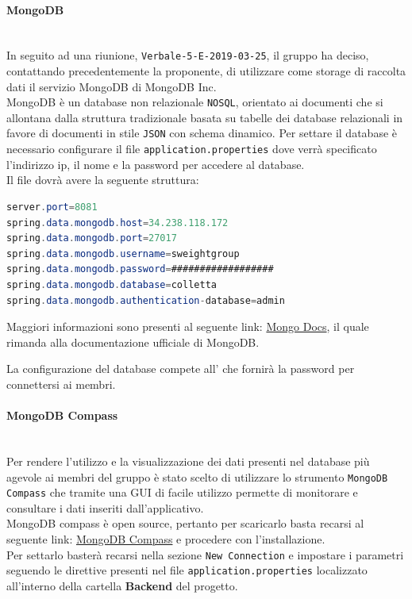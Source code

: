 \paragraph{MongoDB}\mbox{}\\
In seguito ad una riunione, \texttt{Verbale-5-E-2019-03-25}, il gruppo ha deciso, contattando precedentemente la proponente, di utilizzare come storage di raccolta dati il servizio MongoDB di MongoDB Inc.\\
MongoDB è un database non relazionale \texttt{NOSQL}, orientato ai documenti che si allontana dalla struttura tradizionale basata su tabelle dei database relazionali in favore di documenti in stile \texttt{JSON} con schema dinamico. 
Per settare il database è necessario configurare il file \texttt{application.properties} dove verrà specificato l'indirizzo ip, il nome e la password per accedere al database.\\
Il file dovrà avere la seguente struttura: 
\begin{lstlisting}[language=Java] 
server.port=8081
spring.data.mongodb.host=34.238.118.172
spring.data.mongodb.port=27017
spring.data.mongodb.username=sweightgroup
spring.data.mongodb.password=##################
spring.data.mongodb.database=colletta
spring.data.mongodb.authentication-database=admin
\end{lstlisting}
Maggiori informazioni sono presenti al seguente link: \href{https://docs.mongodb.com/?_ga=2.183391522.509639120.1554133474-1194492321.1550924275}{Mongo Docs}, il quale rimanda alla documentazione ufficiale di MongoDB. 

La configurazione del database compete all'\adm{} che fornirà la password per connettersi ai membri.

\paragraph{MongoDB Compass}\mbox{}\\
Per rendere l'utilizzo e la visualizzazione dei dati presenti nel database più agevole ai membri del gruppo è stato scelto di utilizzare lo strumento \texttt{MongoDB Compass} che tramite una {GUI} di facile utilizzo permette di monitorare e consultare i dati inseriti dall'applicativo.\\
MongoDB compass è open source, pertanto per scaricarlo basta recarsi al seguente link: \href{https://www.mongodb.com/products/compass}{MongoDB Compass} e procedere con l'installazione.\\
Per settarlo basterà recarsi nella sezione \texttt{New  Connection} e impostare i parametri seguendo le direttive presenti nel file \texttt{application.properties} localizzato all'interno della cartella \textbf{Backend} del progetto.

